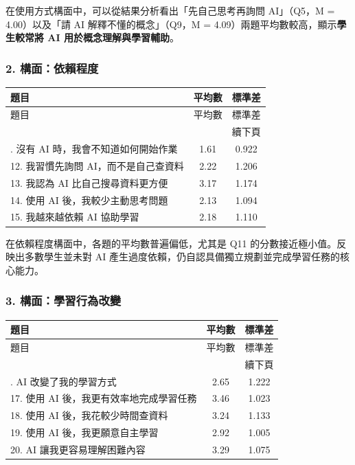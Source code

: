 在使用方式構面中，可以從結果分析看出「先自己思考再詢問 AI」（Q5，M = 4.00）以及「請 AI 解釋不懂的概念」（Q9，M = 4.09）兩題平均數較高，顯示\textbf{學生較常將 AI 用於概念理解與學習輔助}。

\subsubsection{2. 構面：依賴程度}

\begin{longtable}{l c c}
\toprule
題目 & 平均數 & 標準差 \\
\midrule
\endfirsthead
\toprule
題目 & 平均數 & 標準差 \\
\midrule
\endhead
\midrule
\multicolumn{3}{r}{續下頁} \\
\endfoot
\bottomrule
\endlastfoot
11. 沒有 AI 時，我會不知道如何開始作業 & 1.61 & 0.922 \\
12. 我習慣先詢問 AI，而不是自己查資料 & 2.22 & 1.206 \\
13. 我認為 AI 比自己搜尋資料更方便 & 3.17 & 1.174 \\
14. 使用 AI 後，我較少主動思考問題 & 2.13 & 1.094 \\
15. 我越來越依賴 AI 協助學習 & 2.18 & 1.110 \\
\end{longtable}

在依賴程度構面中，各題的平均數普遍偏低，尤其是 Q11 的分數接近極小值。反映出多數學生並未對 AI 產生過度依賴，仍自認具備獨立規劃並完成學習任務的核心能力。

\subsubsection{3. 構面：學習行為改變}

\begin{longtable}{l c c}
\toprule
題目 & 平均數 & 標準差 \\
\midrule
\endfirsthead
\toprule
題目 & 平均數 & 標準差 \\
\midrule
\endhead
\midrule
\multicolumn{3}{r}{續下頁} \\
\endfoot
\bottomrule
\endlastfoot
16. AI 改變了我的學習方式 & 2.65 & 1.222 \\
17. 使用 AI 後，我更有效率地完成學習任務 & 3.46 & 1.023 \\
18. 使用 AI 後，我花較少時間查資料 & 3.24 & 1.133 \\
19. 使用 AI 後，我更願意自主學習 & 2.92 & 1.005 \\
20. AI 讓我更容易理解困難內容 & 3.29 & 1.075 \\
\end{longtable}

